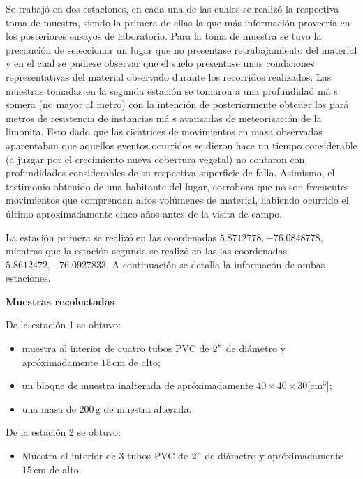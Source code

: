 Se trabaj\'o en dos estaciones, en cada una de las cuales se realiz\'o la respectiva toma de muestra, siendo la primera de ellas la que m\'as informaci\'on proveer\'ia en los posteriores ensayos de laboratorio. Para la toma de muestra se tuvo la precauci\'on de seleccionar un lugar que no presentase retrabajamiento del material y en el cual se pudiese observar que el suelo presentase unas condiciones representativas del material observado durante los recorridos realizados.
Las muestras tomadas en la segunda estaci\'on se tomaron a una profundidad m\'a s somera (no mayor al metro) con la intenci\'on de posteriormente obtener los par\'a metros de resistencia de instancias m\'a s avanzadas de meteorizaci\'on de la limonita. Esto dado que las cicatrices de movimientos en masa observadas aparentaban que aquellos eventos ocurridos se dieron hace un tiempo considerable (a juzgar por el crecimiento nueva cobertura vegetal) no contaron con profundidades considerables de su respectiva superficie de falla. Asimismo, el testimonio obtenido de una habitante del lugar, corrobora que no son frecuentes movimientos que comprendan altos vol\'umenes de material, habiendo ocurrido el \'ultimo aproximadamente cinco años antes de la visita de campo.

La estación primera se realizó en las coordenadas \(5.8712778, -76.0848778\), mientras que la estación segunda se realizó en las las coordenadas \(5.8612472,-76.0927833\).
A continuaci\'on se detalla la informac\'on de ambas estaciones.

\textbf{Muestras recolectadas}

De la estación 1 se obtuvo:
\begin{itemize}
  \item muestra al interior de cuatro tubos PVC de \(2"\) de di\'ametro y apr\'oximadamente \(15\,\text{cm}\) de alto;
  \item un bloque de muestra inalterada  de apr\'oximadamente \(40 \times 40 \times 30\)[cm\(^3\)];
  \item una masa de \(200\,\text{g}\) de muestra alterada.
\end{itemize}

De la estación 2 se obtuvo:
\begin{itemize}
  \item Muestra al interior de 3 tubos PVC de \(2"\) de di\'ametro y apr\'oximadamente \(15\,\text{cm}\) de alto.
\end{itemize}

